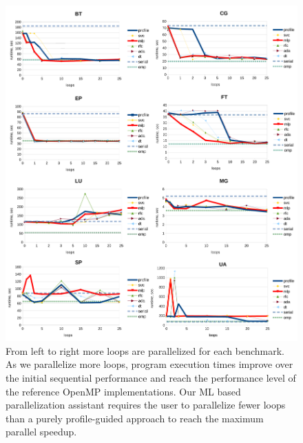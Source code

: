 \begin{figure}[t!]
\centering
\includegraphics[width=1.0\textwidth]{images/perf_conv_curves_new.pdf}
\caption{From left to right more loops are parallelized for each benchmark. As we parallelize more loops, program execution times improve over the initial sequential performance and reach the performance level of the reference OpenMP implementations. Our ML based parallelization assistant requires the user to parallelize fewer loops than a purely profile-guided approach to reach the maximum parallel speedup.}
\label{fig:performance_convergence_line}
\vspace*{5mm} %
\end{figure}
